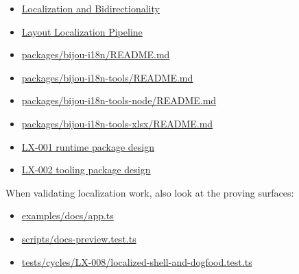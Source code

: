 \begin{itemize}
\tightlist
\item
  \href{https://github.com/flyingrobots/bijou/blob/cbd70612140e7a450d764b3c7be1c6af878b99bc/docs/strategy/localization-and-bidirectionality.md}{Localization and Bidirectionality}
\item
  \href{https://github.com/flyingrobots/bijou/blob/cbd70612140e7a450d764b3c7be1c6af878b99bc/docs/strategy/layout-localization-pipeline.md}{Layout Localization Pipeline}
\item
  \href{https://github.com/flyingrobots/bijou/blob/cbd70612140e7a450d764b3c7be1c6af878b99bc/packages/bijou-i18n/README.md}{packages/bijou-i18n/README.md}
\item
  \href{https://github.com/flyingrobots/bijou/blob/cbd70612140e7a450d764b3c7be1c6af878b99bc/packages/bijou-i18n-tools/README.md}{packages/bijou-i18n-tools/README.md}
\item
  \href{https://github.com/flyingrobots/bijou/blob/cbd70612140e7a450d764b3c7be1c6af878b99bc/packages/bijou-i18n-tools-node/README.md}{packages/bijou-i18n-tools-node/README.md}
\item
  \href{https://github.com/flyingrobots/bijou/blob/cbd70612140e7a450d764b3c7be1c6af878b99bc/packages/bijou-i18n-tools-xlsx/README.md}{packages/bijou-i18n-tools-xlsx/README.md}
\item
  \href{https://github.com/flyingrobots/bijou/blob/cbd70612140e7a450d764b3c7be1c6af878b99bc/docs/design/LX-001-bijou-i18n-runtime-package.md}{LX-001 runtime package design}
\item
  \href{https://github.com/flyingrobots/bijou/blob/cbd70612140e7a450d764b3c7be1c6af878b99bc/docs/design/LX-002-bijou-i18n-tools-package.md}{LX-002 tooling package design}
\end{itemize}

When validating localization work, also look at the proving surfaces:

\begin{itemize}
\tightlist
\item
  \href{https://github.com/flyingrobots/bijou/blob/cbd70612140e7a450d764b3c7be1c6af878b99bc/examples/docs/app.ts}{examples/docs/app.ts}
\item
  \href{https://github.com/flyingrobots/bijou/blob/cbd70612140e7a450d764b3c7be1c6af878b99bc/scripts/docs-preview.test.ts}{scripts/docs-preview.test.ts}
\item
  \href{https://github.com/flyingrobots/bijou/blob/cbd70612140e7a450d764b3c7be1c6af878b99bc/tests/cycles/LX-008/localized-shell-and-dogfood.test.ts}{tests/cycles/LX-008/localized-shell-and-dogfood.test.ts}
\end{itemize}

